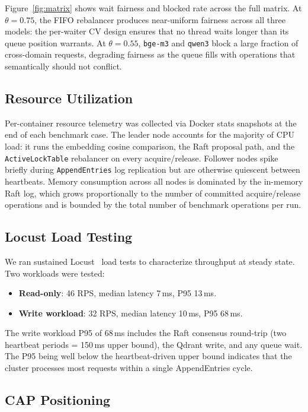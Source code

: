 \documentclass[sigconf]{acmart}
\begin{document}
Figure~\ref{fig:matrix} shows wait fairness and blocked rate across the full matrix.
At $\theta{=}0.75$, the FIFO rebalancer produces near-uniform fairness across all three
models: the per-waiter CV design ensures that no thread waits longer than its queue
position warrants. At $\theta{=}0.55$, \texttt{bge-m3} and \texttt{qwen3} block a large
fraction of cross-domain requests, degrading fairness as the queue fills with operations
that semantically should not conflict.

\subsection{Resource Utilization}

Per-container resource telemetry was collected via Docker stats snapshots at the end of
each benchmark case. The leader node accounts for the majority of CPU load: it runs the
embedding cosine comparison, the Raft proposal path, and the \texttt{Active\-Lock\-Table}
rebalancer on every acquire/release. Follower nodes spike briefly during
\texttt{AppendEntries} log replication but are otherwise quiescent between heartbeats.
Memory consumption across all nodes is dominated by the in-memory Raft log, which grows
proportionally to the number of committed acquire/release operations and is bounded by the
total number of benchmark operations per run.

\subsection{Locust Load Testing}

We ran sustained Locust~\cite{locust} load tests to characterize throughput at steady
state. Two workloads were tested:

\begin{itemize}
  \item \textbf{Read-only}: 46 RPS, median latency 7\,ms, P95 13\,ms.
  \item \textbf{Write workload}: 32 RPS, median latency 10\,ms, P95 68\,ms.
\end{itemize}

The write workload P95 of 68\,ms includes the Raft consensus round-trip (two heartbeat
periods = 150\,ms upper bound), the Qdrant write, and any queue wait. The P95 being well
below the heartbeat-driven upper bound indicates that the cluster processes most requests
within a single AppendEntries cycle.

\subsection{CAP Positioning}
\end{document}
